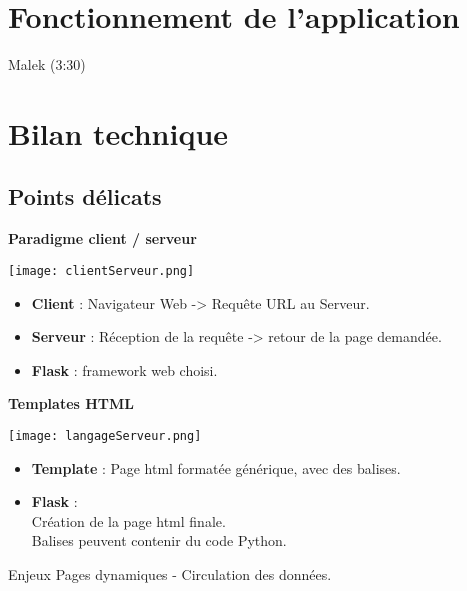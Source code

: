 	\section{Fonctionnement de l'application}
		\begin{frame}
			Malek (3:30)
		\end{frame}
	
	
	\section{Bilan technique}
		\subsection{Points délicats}
		\begin{frame}
			\textbf{Paradigme client / serveur}\\
				\begin{center}\texttt{[image: clientServeur.png]}\end{center}
				\begin{itemize}
				\item \textbf{Client} : Navigateur Web -> Requête URL au Serveur.
				\item \textbf{Serveur} : Réception de la requête -> retour de la page demandée.
				\item \textbf{Flask} : framework web choisi.
				\end{itemize}
		\end{frame}
		
		\begin{frame}
			\textbf{Templates HTML}\\
				\begin{center}\texttt{[image: langageServeur.png]}\end{center}
				\begin{itemize}
				\item \textbf{Template} : Page html formatée générique, avec des balises.
				\item \textbf{Flask} :\\
					Création de la page html finale.\\
					Balises peuvent contenir du code Python.
				\end{itemize}
				\begin{block}{Enjeux}
				Pages dynamiques - Circulation des données.
				\end{block}
		\end{frame}
		
